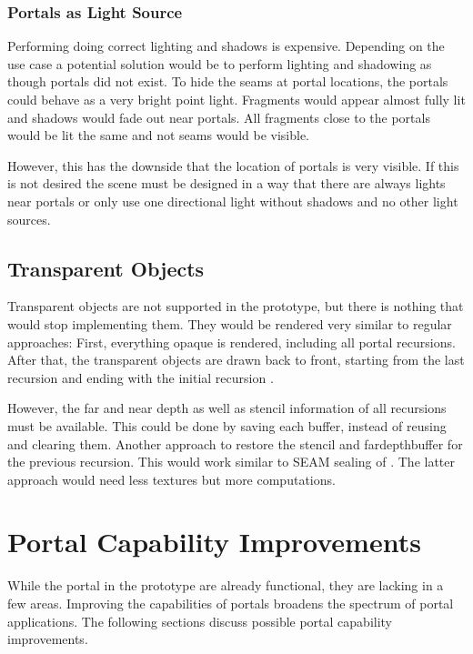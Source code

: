 \subsection{Portals as Light Source}
\label{section:portalsaslights}
Performing doing correct lighting and shadows is expensive. Depending on the use case a potential solution would be to perform lighting and shadowing as though portals did not exist. To hide the seams at portal locations, the portals could behave as a very bright point light. Fragments would appear almost fully lit and shadows would fade out near portals. All fragments close to the portals would be lit the same and not seams would be visible.

However, this has the downside that the location of portals is very visible. If this is not desired the scene must be designed in a way that there are always lights near portals or only use one directional light without shadows and no other light sources.


\section{Transparent Objects}
Transparent objects are not supported in the prototype, but there is nothing that would stop implementing them. They would be rendered very similar to regular approaches: First, everything opaque is rendered, including all portal recursions. After that, the transparent objects are drawn back to front, starting from the last recursion and ending with the initial recursion \cite{lecture:portalProblems}.

However, the far and near depth as well as stencil information of all recursions must be available. This could be done by saving each buffer, instead of reusing and clearing them. Another approach to restore the stencil and \gls{fardepthbuffer} for the previous recursion. This would work similar to SEAM sealing of \textcite{schmalstieg:1999:sewing}. The latter approach would need less textures but more computations.

\chapter{Portal Capability Improvements}
While the portal in the prototype are already functional, they are lacking in a few areas. Improving the capabilities of portals broadens the spectrum of portal applications. The following sections discuss possible portal capability improvements.


